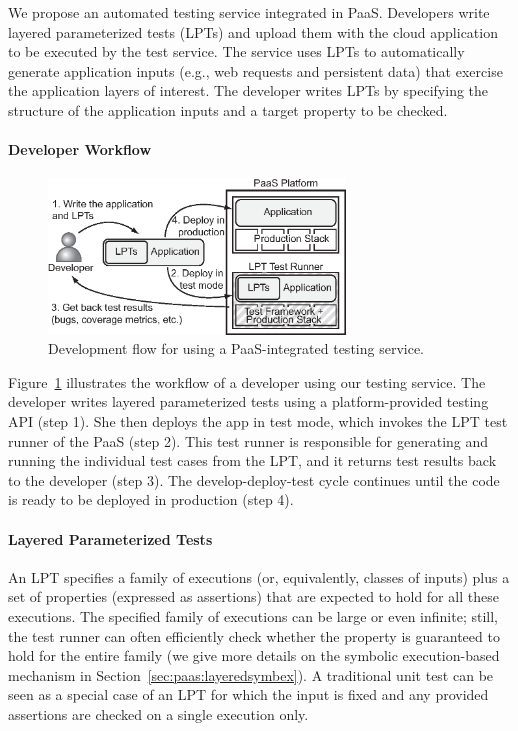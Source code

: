We propose an automated testing service integrated in PaaS.  Developers write layered parameterized tests (LPTs) and upload them with the cloud application to be executed by the test service.  The service uses LPTs to automatically generate application inputs (e.g., web requests and persistent data) that exercise the application layers of interest.  The developer writes LPTs by specifying the structure of the application inputs and a target property to be checked.

\paragraph{Developer Workflow}

\begin{figure}
  \centering
  \includegraphics[width=3.1in]{paas/figures/developer-flow}
  \caption{Development flow for using a PaaS-integrated testing
    service.}
  \label{fig:development-flow}
\end{figure}

Figure~\ref{fig:development-flow} illustrates the workflow of a developer using our testing service.
%
The developer writes layered parameterized tests using a platform-provided testing API (step 1). She then deploys the app in test mode, which invokes the LPT test runner of the PaaS (step 2). This test runner is responsible for generating and running the individual test cases from the LPT, and it returns test results back to the developer (step 3). The develop-deploy-test cycle continues until the code is ready to be deployed in production (step 4).


\paragraph{Layered Parameterized Tests}

An LPT specifies a family of executions (or, equivalently, classes of inputs) plus a set of properties (expressed as assertions) that are expected to hold for all these executions.
%
The specified family of executions can be large or even infinite; still, the test runner can often efficiently check whether the property is guaranteed to hold for the entire family (we give more details on the symbolic execution-based mechanism in Section~\ref{sec:paas:layeredsymbex}).  A traditional unit test can be seen as a special case of an LPT for which the input is fixed and any provided assertions are checked on a single execution only.

